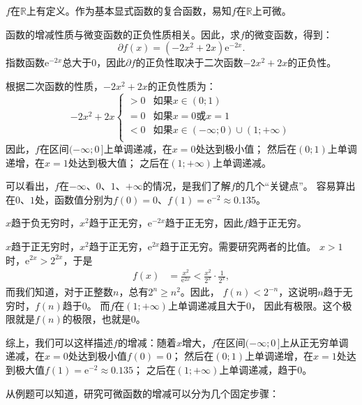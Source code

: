 \documentclass[12pt,UTF8,fontset=none]{ctexbook}
\begin{document}
\begin{so}
    $f$在$\mathbb{R}$上有定义。作为基本显式函数的复合函数，易知$f$在$\mathbb{R}$上可微。

    函数的增减性质与微变函数的正负性质相关。因此，求$f$的微变函数，得到：
    $$ \partial f(x) = (-2x^2 + 2x) \mathrm{e}^{-2x}.$$
    指数函数$ \mathrm{e}^{-2x} $总大于$0$，因此$ \partial f $的正负性取决于二次函数$-2x^2 + 2x$的正负性。
    
    根据二次函数的性质，$-2x^2 + 2x$的正负性质为：
    $$ -2x^2 + 2x \left\{
        \begin{array}{cl}
            > 0 & \mbox{如果}x \in (0; 1) \\
            = 0 & \mbox{如果}x = 0 \mbox{或} x = 1 \\
            < 0 & \mbox{如果}x \in (-\infty; 0)\cup (1; +\infty)\\
        \end{array}\right.
    $$
    因此，$f$在区间$(-\infty; 0\,]$上单调递减，在$x = 0$处达到极小值；
    然后在$(0; 1)$上单调递增，在$x = 1$处达到极大值；
    之后在$(1; +\infty)$上单调递减。

    可以看出，$f$在$-\infty$、$0$、$1$、$+\infty$的情况，是我们了解$f$的几个“关键点”。
    容易算出在$0$、$1$处，函数值分别为$f(0) = 0$、$f(1) = \mathrm{e}^{-2} \approx 0.135$。
    
    $x$趋于负无穷时，$x^2$趋于正无穷，$\mathrm{e}^{-2x}$趋于正无穷，因此$f$趋于正无穷。

    $x$趋于正无穷时，$x^2$趋于正无穷，$\mathrm{e}^{2x}$趋于正无穷。需要研究两者的比值。
    $x > 1$时，$\mathrm{e}^{2x} > 2^{2x}$，于是
    \begin{align*}
        f(x) &= \frac{x^2}{\mathrm{e}^{2x}} < \frac{x^2}{2^x} \cdot \frac{1}{2^x}, 
    \end{align*} 
    而我们知道，对于正整数$n$，总有$2^n \geqslant n^2$。因此，
    $f(n) < 2^{-n}$，这说明$n$趋于无穷时，$f(n)$趋于$0$。
    而$f$在$(1;+\infty)$上单调递减且大于$0$，
    因此有极限。这个极限就是$f(n)$的极限，也就是$0$。

    综上，我们可以这样描述$f$的增减：随着$x$增大，$f$在区间$(-\infty; 0\,]$上从正无穷单调递减，在$x = 0$处达到极小值$f(0) = 0$；
    然后在$(0; 1)$上单调递增，在$x = 1$处达到极大值$f(1) = \mathrm{e}^{-2} \approx 0.135$；
    之后在$(1; +\infty)$上单调递减，趋于$0$。
\end{so}

从例题可以知道，研究可微函数的增减可以分为几个固定步骤：

\begin{center}
\end{center}
\end{document}

